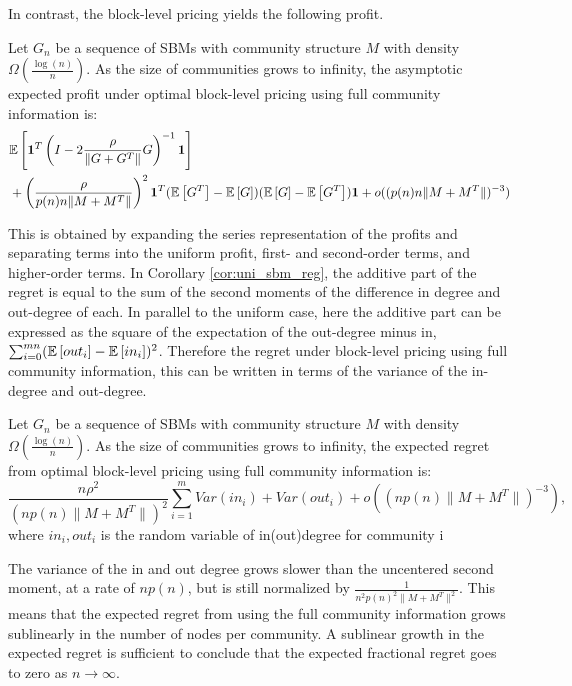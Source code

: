 In contrast, the block-level pricing yields the following profit.  
\begin{theorem}\label{thm:sbm_block}
    Let $G_n$ be a sequence of SBMs with community structure $M$ with density $\Omega(\frac{\log (n)}{n})$. As the size of communities grows to infinity, the asymptotic expected profit under optimal block-level pricing using full community information is:
        \begin{align*}
        &\mathbb{E}\left[  \mathbf{1}^T \left(I - 2\frac{\rho}{\|G+G^T\|} G \right)^{-1} \mathbf{1}\right]  \\
        &+ \left(\frac{\rho}{p(n) n \|M+M^T\|}\right)^2  \mathbf{1}^T ( \mathbb{E}\left[G^T\right]-\mathbb{E}\left[G\right])(\mathbb{E}\left[G\right]-\mathbb{E}\left[G^T\right])\mathbf{1} + o( (p(n) n \|M+M^T\|)^{-3} )
    \end{align*}
\end{theorem}

This is obtained by expanding the series representation of the profits and separating terms into the uniform profit, first- and second-order terms, and higher-order terms.  In Corollary \ref{cor:uni_sbm_reg}, the additive part of the regret is equal to the sum of the second moments of the difference in degree and out-degree of each. In parallel to the uniform case, here the additive part can be expressed as the square of the expectation of the out-degree minus in, $\sum_{i=0}^{mn} (\mathbb{E}\left[out_i\right] - \mathbb{E}\left[in_i\right])^2$. Therefore the regret under block-level pricing using full community information, this can be written in terms of the variance of the in-degree and out-degree. 
\begin{theorem}\label{prop:var_expression}
        Let $G_n$ be a sequence of SBMs with community structure $M$ with density $\Omega(\frac{\log (n)}{n})$. As the size of communities grows to infinity, the expected regret from optimal block-level pricing using full community information is:
    \begin{equation}
        \frac{ n \rho^2}{ (n p(n) \|M+M^T\|)^2 } \sum_{i =1 }^{m} Var( in_i ) + Var(out_i)   + o\left( \left(n p(n) \|M+M^T\|\right)^{-3}\right),
    \end{equation}
    where $in_i, out_i$ is the random variable of in(out)degree for community  i
\end{theorem}

The variance of the in and out degree grows slower than the uncentered second moment, at a rate of $n p(n)$, but is still normalized by $\frac{1}{n^2 p(n)^2 \|M+M^T\|^2 }$. This means that the expected regret from using the full community information grows sublinearly in the number of nodes per community. A sublinear growth in the expected regret is sufficient to conclude that the expected fractional regret goes to zero as $n \to \infty$. 



